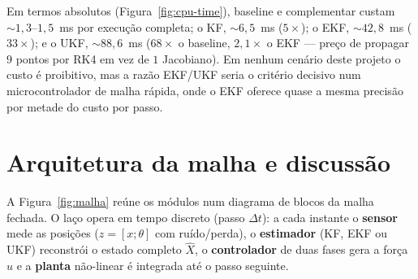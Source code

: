 \documentclass[brazil, 12pt]{article}
\begin{document}
Em termos absolutos (Figura~\ref{fig:cpu-time}), baseline e complementar
custam ${\sim}1{,}3$--$1{,}5$~ms por execução completa; o KF, ${\sim}6{,}5$~ms
($5\times$); o EKF, ${\sim}42{,}8$~ms ($33\times$); e o UKF, ${\sim}88{,}6$~ms
($68\times$ o baseline, $2{,}1\times$ o EKF — preço de propagar $9$ pontos
por RK4 em vez de $1$ Jacobiano). Em nenhum cenário deste projeto o custo é
proibitivo, mas a razão EKF/UKF seria o critério decisivo num
microcontrolador de malha rápida, onde o EKF oferece quase a mesma precisão
por metade do custo por passo.


\section{Arquitetura da malha e discussão}

A Figura~\ref{fig:malha} reúne os módulos num diagrama de blocos da malha
fechada. O laço opera em tempo discreto (passo $\Delta t$): a cada instante o
\textbf{sensor} mede as posições ($z=[x;\theta]$ com ruído/perda), o
\textbf{estimador} (KF, EKF ou UKF) reconstrói o estado completo $\hat{X}$, o
\textbf{controlador} de duas fases gera a força $u$ e a \textbf{planta}
não-linear é integrada até o passo seguinte.
\end{document}
